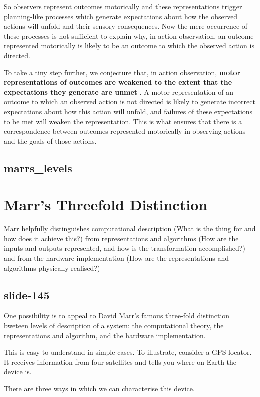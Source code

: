\documentclass[12pt,\papersize]{extarticle}
\begin{document}
So observers represent outcomes motorically and these representations trigger planning-like processes
which generate expectations about how the observed actions will unfold and their sensory consequences.
Now the mere occurrence of these processes is not sufficient to explain why, in action observation,
an outcome represented motorically is likely to be an outcome to which the observed action is
directed.

To take a tiny step further, we conjecture that, in action observation, \textbf{motor representations of
outcomes are weakened to the extent that the expectations they generate are unmet}
\citep[compare][]{Fogassi:2005nf}.
A motor representation of an outcome to which an observed action is not directed is likely to
generate incorrect expectations about how this action will unfold, and failures of these
expectations to be met will weaken the representation.
This is what ensures that there is a correspondence between outcomes represented motorically in
observing actions and the goals of those actions.

\subsection{marrs\_levels}


\section{Marr’s Threefold Distinction}

Marr helpfully distinguishes computational description (What is the thing for and how does it achieve this?)
from representations and algorithms (How are the inputs and outputs represented, and how is the transformation accomplished?)
and from the hardware implementation (How are the  representations and algorithms physically realised?)

\subsection{slide-145}
One possibility is to appeal to David Marr’s famous three-fold distinction
bweteen levels of description of a system: the computational theory, the
representations and algorithm, and the hardware implementation.

This is easy to understand in simple cases.
To illustrate, consider a GPS locator.
It receives information from four satellites and tells you where on Earth the device is.

There are three ways in which we can characterise this device.
\end{document}
